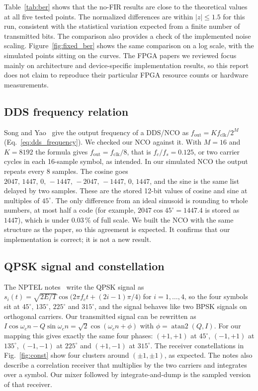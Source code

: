 \documentclass[10pt,twocolumn,letterpaper]{article}
\begin{document}
Table~\ref{tab:ber} shows that the no-FIR results are close to the theoretical values at all five tested points. The normalized differences are within $|z|\leq 1.5$ for this run, consistent with the statistical variation expected from a finite number of transmitted bits. The comparison also provides a check of the implemented noise scaling. Figure~\ref{fig:fixed_ber} shows the same comparison on a log scale, with the simulated points sitting on the curves. The FPGA papers we reviewed focus mainly on architecture and device-specific implementation results, so this report does not claim to reproduce their particular FPGA resource counts or hardware measurements.

\subsection{DDS frequency relation}
Song and Yao~\cite{song2010qpsk} give the output frequency of a DDS/NCO as
$f_{\mathrm{out}}=Kf_{\mathrm{clk}}/2^M$
(Eq.~\ref{eq:dds_frequency}). We checked our NCO against it. With $M=16$ and
$K=8192$ the formula gives $f_{\mathrm{out}}=f_{\mathrm{clk}}/8$, that is
$f_c/f_s=0.125$, or two carrier cycles in each 16-sample symbol, as intended.
In our simulated NCO the output repeats every 8 samples. The cosine goes
$2047,\,1447,\,0,\,-1447,\,-2047,\,-1447,\,0,\,1447$, and the sine is the
same list delayed by two samples. These are the stored 12-bit values of
cosine and sine at multiples of $45^\circ$. The only difference from an ideal
sinusoid is rounding to whole numbers, at most half a code (for example,
$2047\cos 45^\circ=1447.4$ is stored as $1447$), which is under
$0.03\,\%$ of full scale. We built the NCO with the same structure as the
paper, so this agreement is expected. It confirms that our implementation is
correct; it is not a new result.

\subsection{QPSK signal and constellation}
The NPTEL notes~\cite{nptel_qpsk} write the QPSK signal as
$s_i(t)=\sqrt{2E/T}\cos\!\big(2\pi f_ct+(2i-1)\pi/4\big)$ for $i=1,\dots,4$,
so the four symbols sit at $45^\circ$, $135^\circ$, $225^\circ$ and
$315^\circ$, and the signal behaves like two BPSK signals on orthogonal
carriers. Our transmitted signal can be rewritten as
$I\cos\omega_cn-Q\sin\omega_cn=\sqrt2\cos(\omega_cn+\phi)$ with
$\phi=\operatorname{atan2}(Q,I)$. For our mapping this gives exactly the same four
phases: $(+1,+1)$ at $45^\circ$, $(-1,+1)$ at $135^\circ$, $(-1,-1)$ at
$225^\circ$ and $(+1,-1)$ at $315^\circ$. The receiver constellations in
Fig.~\ref{fig:const} show four clusters around $(\pm1,\pm1)$, as expected.
The notes also describe a correlation receiver that multiplies by the two
carriers and integrates over a symbol. Our mixer followed by integrate-and-dump
is the sampled version of that receiver.
\end{document}
